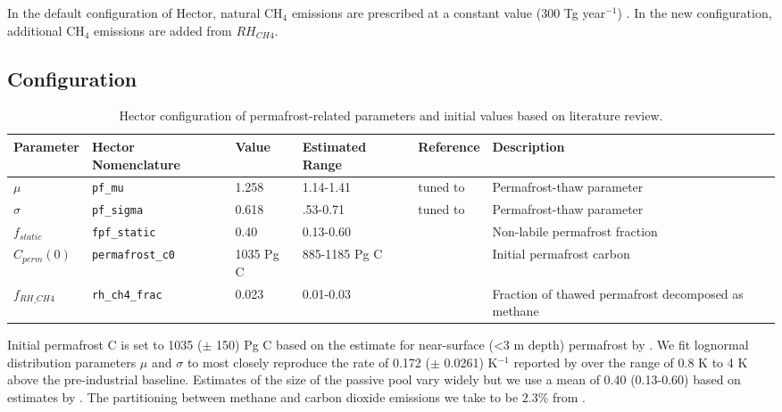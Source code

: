 \documentclass[essd, manuscript]{copernicus}
\begin{document}
In the default configuration of Hector, natural CH$_4$ emissions are prescribed at a constant value (300 Tg year$^{-1}$) \citep{hartin_2015_simple}.
In the new configuration, additional CH$_4$ emissions are added from $RH_{CH4}$.

\subsection{Configuration}
\begin{table}[ht!]
\centering
\caption{Hector configuration of permafrost-related parameters and initial values based on literature review.}
 \begin{tabularx}{\textwidth}{l l l l p{1.25in} p{1.75in}} 
 \hline\noalign{\medskip}
Parameter & Hector Nomenclature & Value & Estimated Range & Reference & Description\\ [1ex]
 \hline\noalign{\medskip}
 $\mu$ & \texttt{pf\_mu} & 1.258 & 1.14-1.41 & tuned to \citet{kessler_2017_estimating} & Permafrost-thaw parameter \\ 
$\sigma$ & \texttt{pf\_sigma} & 0.618 & .53-0.71 & tuned to \citet{kessler_2017_estimating} & Permafrost-thaw parameter \\
 $f_{static}$ & \texttt{fpf\_static} & 0.40 & 0.13-0.60 & \citet{burke_2012_uncertainties, burke_2013_estimating} & Non-labile permafrost fraction \\ 
 $C_{perm}(0)$ & \texttt{permafrost\_c0} & 1035 Pg C & 885-1185 Pg C & \citet{hugelius_2014_estimated} & Initial permafrost carbon\\
  $f_{RH\_CH4}$ & \texttt{rh\_ch4\_frac} & 0.023 & 0.01-0.03 & \citet{kessler_2017_estimating} & Fraction of thawed permafrost \mbox{decomposed} as methane \\[1ex] 
 \hline
 \end{tabularx}
 \label{table:config}
\end{table}
Initial permafrost C is set to 1035 ($\pm$ 150) Pg C based on the estimate for near-surface (<3 m depth) permafrost by \citet{hugelius_2014_estimated}. We fit lognormal distribution parameters $\mu$ and $\sigma$ to most closely reproduce the rate of 0.172 ($\pm$ 0.0261) K$^{-1}$ reported by \citet{kessler_2017_estimating} over the range of 0.8 K \footnotemark to 4 K above the pre-industrial baseline. Estimates of the size of the passive pool vary widely but we use a mean of 0.40 (0.13-0.60) based on estimates by \citet{burke_2012_uncertainties, burke_2013_estimating}. The partitioning between methane and carbon dioxide emissions we take to be 2.3\% from \citet{kessler_2017_estimating}.
\end{document}
